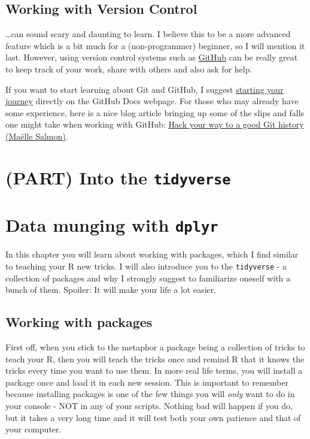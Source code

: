 \documentclass[
]{book}
\begin{document}
\section*{Working with Version Control}\label{working-with-version-control}

\ldots can sound scary and daunting to learn.
I believe this to be a more advanced feature which is a bit much for a (non-programmer) beginner, so I will mention it last.
However, using version control systems such as \href{https://github.com/}{GitHub} can be really great to keep track of your work, share with others and also ask for help.

If you want to start learning about Git and GitHub, I suggest \href{https://docs.github.com/en/get-started/start-your-journey/about-github-and-git}{starting your journey} directly on the GitHub Docs webpage.
For those who may already have some experience, here is a nice blog article bringing up some of the slips and falls one might take when working with GitHub: \href{https://www.r-bloggers.com/2024/06/hack-your-way-to-a-good-git-history/}{Hack your way to a good Git history (Maëlle Salmon)}.

\chapter*{\texorpdfstring{(PART) Into the \texttt{tidyverse}}{(PART) Into the tidyverse}}\label{part-into-the-tidyverse}

\chapter{\texorpdfstring{Data munging with \texttt{dplyr}}{Data munging with dplyr}}\label{dplyr}

In this chapter you will learn about working with packages, which I find similar to teaching your R new tricks.
I will also introduce you to the \texttt{tidyverse} - a collection of packages and why I strongly suggest to familiarize oneself with a bunch of them.
Spoiler: It will make your life a lot easier.

\section{Working with packages}\label{working-with-packages}

First off, when you stick to the metaphor a package being a collection of tricks to teach your R, then you will teach the tricks once and remind R that it knows the tricks every time you want to use them.
In more real life terms, you will install a package once and load it in each new session.
This is important to remember because installing packages is one of the few things you will \emph{only} want to do in your console - NOT in any of your scripts.
Nothing bad will happen if you do, but it takes a very long time and it will test both your own patience and that of your computer.
\end{document}
